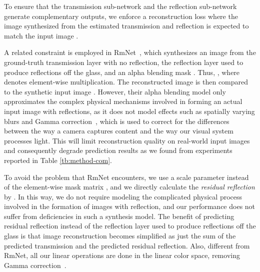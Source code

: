 \documentclass[10pt,twocolumn,letterpaper]{article}
\begin{document}
To ensure that the transmission sub-network and the reflection sub-network generate complementary outputs, we enforce a reconstruction loss where the image  synthesized from the estimated transmission and reflection is expected to match the input image . 

A related constraint is employed in RmNet~\cite{wen2019single}, which synthesizes an image  from the 
ground-truth transmission layer with no reflection,
the reflection layer used to produce reflections off the glass, and an alpha blending mask . Thus, 
,  
where  denotes element-wise multiplication. 
The reconstructed image  is then compared to the synthetic input image . However, their alpha blending model only approximates the complex physical mechanisms involved in forming an actual input image with reflections, as it does not model effects such as spatially varying blurs and Gamma correction~\cite{BULL201499}, which is used to correct for the differences between the way a camera captures content and the way our visual system processes light. This will limit reconstruction quality on real-world input images and consequently degrade prediction results as we found from experiments reported in Table \ref{tb:method-com}. 

To avoid the problem that RmNet encounters, we use a scale parameter  instead of the element-wise mask matrix , and we directly calculate the {\em residual reflection}  by . In this way, we do not require modeling the complicated physical process involved in the formation of images with reflection, and our performance does not suffer from deficiencies in such a synthesis model. The benefit of predicting residual reflection instead of the reflection layer used to produce reflections off the glass is that image reconstruction becomes simplified as just the sum of the predicted transmission and the predicted residual reflection.
Also, different from RmNet, all our linear operations are done in the linear color space, removing Gamma correction~\cite{BULL201499}.
\end{document}
